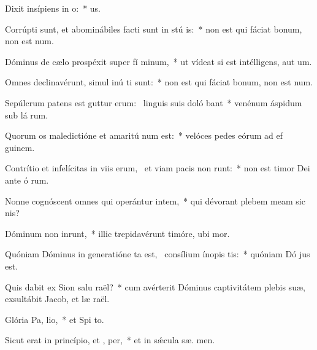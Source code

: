\item Dixit insípiens in  o:~*   us.
\item Corrúpti sunt, et abominábiles facti sunt in stú is:~* non est qui fáciat bonum, non est   num.
\item Dóminus de cælo prospéxit super fí minum,~* ut vídeat si est intélligens, aut  um.
\item Omnes declinavérunt, simul inú ti sunt:~* non est qui fáciat bonum, non est   num.
\item Sepúlcrum patens est guttur erum:~\pscross{} linguis suis doló bant~* venénum áspidum sub lá rum.
\item Quorum os maledictióne et amaritú num est:~* velóces pedes eórum ad ef guinem.
\item Contrítio et infelícitas in viis erum,~\pscross{} et viam pacis non runt:~* non est timor Dei ante ó rum.
\item Nonne cognóscent omnes qui operántur intem,~* qui dévorant plebem meam sic  nis?
\item Dóminum non inrunt,~* illic trepidavérunt timóre, ubi   mor.
\item Quóniam Dóminus in generatióne ta est,~\pscross{} consílium ínopis tis:~* quóniam Dó  jus est.
\item Quis dabit ex Sion salu raël?~* cum avérterit Dóminus captivitátem plebis suæ, exsultábit Jacob, et læ raël.
\item Glória Pa,  lio,~* et Spi to.
\item Sicut erat in princípio, et ,  per,~* et in sǽcula sæ. men.
